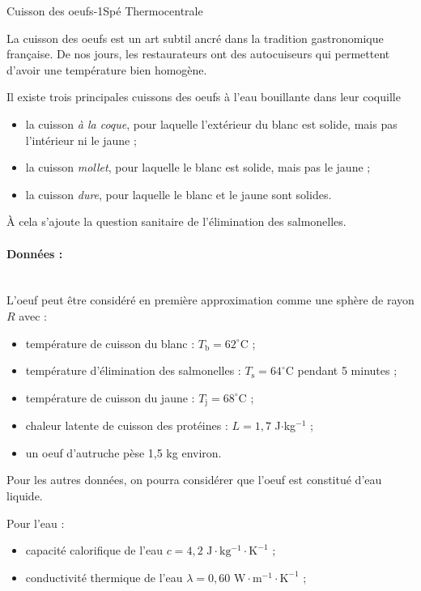 \begin{exercise}{Cuisson des oeufs}{-1}{Spé}
{Thermo}{centrale}

La cuisson des oeufs est un art subtil ancré dans la tradition gastronomique française. De nos jours, les restaurateurs ont des autocuiseurs qui permettent d'avoir une température bien homogène.

Il existe trois principales cuissons des oeufs à l'eau bouillante dans leur coquille 
\begin{itemize}
    \item la cuisson \emph{à la coque}, pour laquelle l'extérieur du blanc est solide, mais pas l'intérieur ni le jaune ;
    \item la cuisson \emph{mollet}, pour laquelle le blanc est solide, mais pas le jaune ;
    \item la cuisson \emph{dure}, pour laquelle le blanc et le jaune sont solides.
\end{itemize}

\`A cela s'ajoute la question sanitaire de l'élimination des salmonelles.

\paragraph{Données :}~\\
L'oeuf peut être considéré en première approximation comme une sphère de rayon $R$ avec :
\begin{itemize}
    \item température de cuisson du blanc : $T_\text{b} = 62^\circ$C ;
    \item température d'élimination des salmonelles : $T_\text{s} = 64^\circ$C pendant 5 minutes ;
    \item température de cuisson du jaune : $T_\text{j} = 68^\circ$C ;
    \item chaleur latente de cuisson des protéines : $L = 1,7$ J$\cdot$kg$^{-1}$ ;
    \item un oeuf d'autruche pèse 1,5 kg environ.
\end{itemize}
Pour les autres données, on pourra considérer que l'oeuf est constitué d'eau liquide.

Pour l'eau :
\begin{itemize}
    \item capacité calorifique de l'eau $c = 4,2$ $\mathrm{J\cdot kg^{-1}\cdot K^{-1}}$ ;
    \item conductivité thermique de l'eau $\lambda = 0,60$ $\mathrm{W\cdot m^{-1}\cdot K^{-1}}$ ;
\end{itemize}


\end{exercise}
